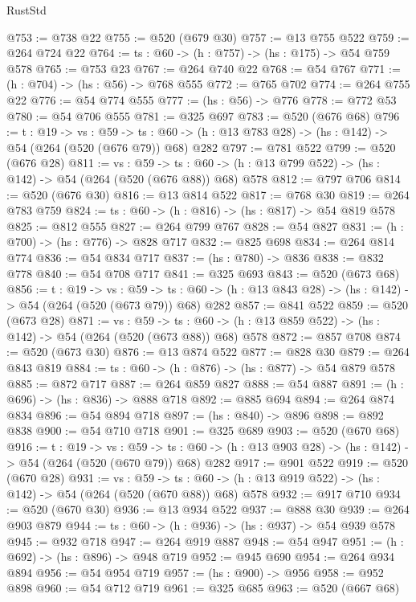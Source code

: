 \begin{lexlean}{RustStd}
\begin{coremodule}
{\begin{coremodule}
{{{{{@753 := @738 @22
@755 := @520 (@679 @30)
@757 := @13 @755 @522
@759 := @264 @724 @22
@764 := {ts : @60} -> (h : @757) -> (hs : @175) -> @54 @759 @578
@765 := @753 @23
@767 := @264 @740 @22
@768 := @54 @767
@771 := (h : @704) -> (hs : @56) -> @768 @555
@772 := @765 @702
@774 := @264 @755 @22
@776 := @54 @774 @555
@777 := (hs : @56) -> @776
@778 := @772 @53
@780 := @54 @706 @555
@781 := @325 @697
@783 := @520 (@676 @68)
@796 := {t : @19} ->
  {vs : @59} ->
  {ts : @60} -> (h : @13 @783 @28) -> (hs : @142) -> @54 (@264 (@520 (@676 @79)) @68) @282
@797 := @781 @522
@799 := @520 (@676 @28)
@811 := {vs : @59} ->
  {ts : @60} -> (h : @13 @799 @522) -> (hs : @142) -> @54 (@264 (@520 (@676 @88)) @68) @578
@812 := @797 @706
@814 := @520 (@676 @30)
@816 := @13 @814 @522
@817 := @768 @30
@819 := @264 @783 @759
@824 := {ts : @60} -> (h : @816) -> (hs : @817) -> @54 @819 @578
@825 := @812 @555
@827 := @264 @799 @767
@828 := @54 @827
@831 := (h : @700) -> (hs : @776) -> @828 @717
@832 := @825 @698
@834 := @264 @814 @774
@836 := @54 @834 @717
@837 := (hs : @780) -> @836
@838 := @832 @778
@840 := @54 @708 @717
@841 := @325 @693
@843 := @520 (@673 @68)
@856 := {t : @19} ->
  {vs : @59} ->
  {ts : @60} -> (h : @13 @843 @28) -> (hs : @142) -> @54 (@264 (@520 (@673 @79)) @68) @282
@857 := @841 @522
@859 := @520 (@673 @28)
@871 := {vs : @59} ->
  {ts : @60} -> (h : @13 @859 @522) -> (hs : @142) -> @54 (@264 (@520 (@673 @88)) @68) @578
@872 := @857 @708
@874 := @520 (@673 @30)
@876 := @13 @874 @522
@877 := @828 @30
@879 := @264 @843 @819
@884 := {ts : @60} -> (h : @876) -> (hs : @877) -> @54 @879 @578
@885 := @872 @717
@887 := @264 @859 @827
@888 := @54 @887
@891 := (h : @696) -> (hs : @836) -> @888 @718
@892 := @885 @694
@894 := @264 @874 @834
@896 := @54 @894 @718
@897 := (hs : @840) -> @896
@898 := @892 @838
@900 := @54 @710 @718
@901 := @325 @689
@903 := @520 (@670 @68)
@916 := {t : @19} ->
  {vs : @59} ->
  {ts : @60} -> (h : @13 @903 @28) -> (hs : @142) -> @54 (@264 (@520 (@670 @79)) @68) @282
@917 := @901 @522
@919 := @520 (@670 @28)
@931 := {vs : @59} ->
  {ts : @60} -> (h : @13 @919 @522) -> (hs : @142) -> @54 (@264 (@520 (@670 @88)) @68) @578
@932 := @917 @710
@934 := @520 (@670 @30)
@936 := @13 @934 @522
@937 := @888 @30
@939 := @264 @903 @879
@944 := {ts : @60} -> (h : @936) -> (hs : @937) -> @54 @939 @578
@945 := @932 @718
@947 := @264 @919 @887
@948 := @54 @947
@951 := (h : @692) -> (hs : @896) -> @948 @719
@952 := @945 @690
@954 := @264 @934 @894
@956 := @54 @954 @719
@957 := (hs : @900) -> @956
@958 := @952 @898
@960 := @54 @712 @719
@961 := @325 @685
@963 := @520 (@667 @68)
}}}}}
\end{coremodule}}
\end{coremodule}
\end{lexlean}
